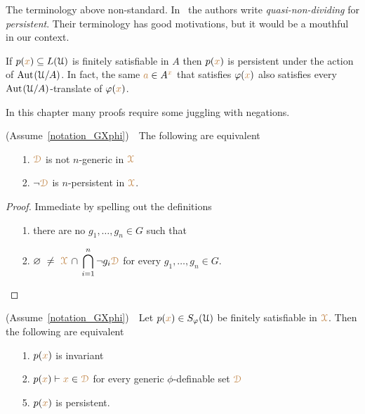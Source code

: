 \noindent\llap{\textcolor{red}{\Large\warning}\kern1.5ex}\ignorespaces
The terminology above non-standard.
In~\cite{CK} the authors write \textit{quasi-non-dividing\/} for \textit{persistent}.
Their terminology has good motivations, but it would be a mouthful in our context.

\begin{example}
  If $p({\color{brown} x})\subseteq L(\EuScript U)$ is finitely satisfiable in $A$ then $p({\color{brown} x})$ is persistent under the action of ${\rm Aut\kern.15ex}(\EuScript U/A)$.
  In fact, the same ${\color{brown} a}\in A^{\color{brown} x}$ that satisfies $\varphi({\color{brown} x})$ also satisfies every ${\rm Aut\kern.15ex}(\EuScript U/A)$-translate of $\varphi({\color{brown} x})$.
\end{example}

In this chapter many proofs require some juggling with negations.

\begin{fact}\label{fact_fip}
  (Assume~\ref{notation_GXphi})\ \  
  The following are equivalent
  \begin{itemize}
    \item[1.] ${\color{brown}\EuScript D}$ is not $n$-generic in ${\color{brown}\EuScript X}$
    \item[2.] $\neg{\color{brown}\EuScript D}$ is $n$-persistent in ${\color{brown}\EuScript X}$.
  \end{itemize}
\end{fact}

\begin{proof}
  Immediate by spelling out the definitions\smallskip
  \begin{itemize}
    \item[1.] there are no $g_1,\dots,g_n\in G$ such that 
    \item[2.]  $\displaystyle\0\ \neq\ \mrX\,\cap\,\bigcap_{i=1}^n\neg g_i{\mr\D}$ for every $g_1,\dots,g_n\in G$.\qedhere
  \end{itemize} 
\end{proof}

\begin{theorem}\label{thm_generic_invariant}
  (Assume~\ref{notation_GXphi})\ \  
  Let $p({\color{brown} x})\in S_\varphi(\EuScript U)$ be finitely satisfiable in ${\color{brown}\EuScript X}$.
  Then the following are equivalent
  \begin{itemize}
    \item[1.] $p({\color{brown} x})$ is invariant
    \item[2.] $p({\color{brown} x})\vdash{\color{brown}x}\in{\color{brown}\EuScript D}$ for every generic $\phi$-definable set ${\color{brown}\EuScript D}$
    \item[5.] $p({\color{brown} x})$ is persistent.
  \end{itemize}
\end{theorem}

